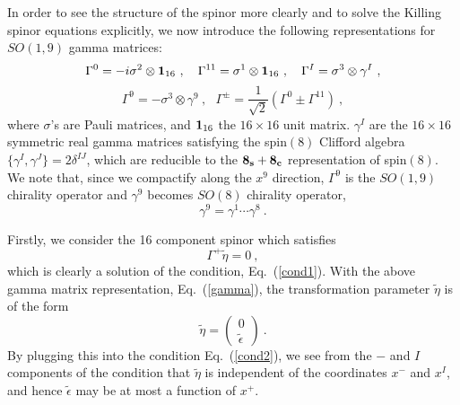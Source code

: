 \documentclass[a4paper,12pt]{article}
\begin{document}
In order to see the structure of the spinor more clearly and to solve
the Killing spinor equations explicitly, we now introduce the
following representations for $SO(1,9)$ gamma matrices:
\[
 \Gamma^0= -i\sigma^2 \otimes {\bf 1}_{16}~,~~~
 \Gamma^{11}= \sigma^1 \otimes {\bf 1}_{16}~,~~~
 \Gamma^I= \sigma^3 \otimes \gamma^I~,
\]
\begin{equation}
 \Gamma^9= -\sigma^3 \otimes \gamma^9~,~~~
 \Gamma^{\pm} = \frac{1}{\sqrt{2}}(\Gamma^0 \pm \Gamma^{11})~,
\label{gamma}
\end{equation}
where $\sigma$'s are Pauli matrices, and ${\bf 1}_{16}$ the $16 \times
16$ unit matrix. $\gamma^I$ are the $16 \times 16$ symmetric real
gamma matrices satisfying the spin$(8)$ Clifford algebra $\{ \gamma^I,
\gamma^J \} = 2 \delta^{IJ}$, which are reducible to the ${\bf
8_s}+{\bf 8_c}$ representation of spin$(8)$.  We note that, since we
compactify along the $x^9$ direction, $\Gamma^9$ is the $SO(1,9)$
chirality operator and $\gamma^9$ becomes $SO(8)$ chirality operator,
\[
\gamma^9 = \gamma^1 \cdots \gamma^8~.
\]

Firstly, we consider the 16 component spinor  which satisfies
\begin{equation}
\Gamma^+ \tilde{\eta}=0~, 
\end{equation}
which is clearly a solution of the condition, Eq.~(\ref{cond1}).  With
the above gamma matrix representation, Eq.~(\ref{gamma}), the
transformation parameter $\tilde{\eta}$ is of the form
\begin{equation}
\tilde{\eta} = \left( 
              \begin{array}{c} 0 \\ \tilde{\epsilon} \end{array}
       \right) ~.  \label{kin}
\end{equation}
By plugging this into the condition Eq.~(\ref{cond2}), we see from the
$-$ and $I$ components of the condition that $\tilde{\eta}$ is
independent of the coordinates $x^-$ and $x^I$, and hence
$\tilde{\epsilon}$ may be at most a function of $x^+$.
\end{document}
